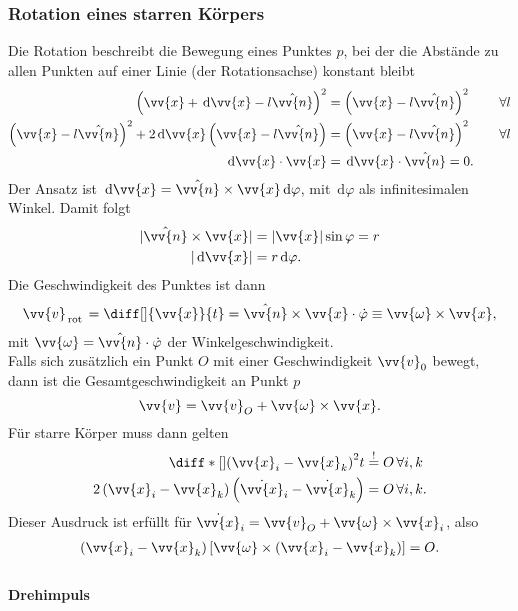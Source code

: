 \documentclass[a4paper,12pt]{article}
\newcommand{\td}{\,\text{d}}
\numberwithin{equation}{section}
\begin{document}
\subsubsection{Rotation eines starren Körpers}
Die Rotation beschreibt die Bewegung eines Punktes $p$, bei der die Abstände zu allen Punkten auf einer Linie (der Rotationsachse) konstant bleibt
\begin{align*}
        \left(\vv{x}+\td \vv{x}-l\hat{\vv{n}}\right)^2&=\left(\vv{x}-l\hat{\vv{n}}\right)^2\qquad \,\forall l\\
        \left(\vv{x}-l\hat{\vv{n}}\right)^2+2\td \vv{x}\left(\vv{x}-l\hat{\vv{n}}\right)&=\left(\vv{x}-l\hat{\vv{n}}\right)^2\qquad \,\forall l\\
        \td \vv{x}\cdot \vv{x}&=\td \vv{x}\cdot \hat{\vv{n}}=0
.\end{align*}
Der Ansatz ist $\td \vv{x}=\hat{\vv{n}}\times \vv{x}\td \varphi $, mit $\td \varphi $ als infinitesimalen Winkel. Damit folgt
\begin{align*}
        |\hat{\vv{n}}\times \vv{x}|&=|\vv{x}|\sin \varphi =r\\
        |\td \vv{x}|&=r\td \varphi 
.\end{align*}
Die Geschwindigkeit des Punktes ist dann
\begin{align*}
        \vv{v}_{\,\text{rot}\,}=\diff[]{\vv{x}}{t}=\hat{\vv{n}}\times \vv{x}\cdot \dot{\varphi }\equiv \vv{\omega }\times \vv{x}
,\end{align*}
mit $\vv{\omega }=\hat{\vv{n}}\cdot \dot{\varphi }$ der Winkelgeschwindigkeit.\\\indent
Falls sich zusätzlich ein Punkt $O$ mit einer Geschwindigkeit $\vv{v}_0$ bewegt, dann ist die Gesamtgeschwindigkeit an Punkt $p$
\[ 
        \vv{v}=\vv{v}_O+\vv{\omega }\times \vv{x}
.\] 
Für starre Körper muss dann gelten
\begin{align*}
        \diff*[]{\left(\vv{x}_i-\vv{x}_k\right)^2}{t}&\stackrel{!}{=}O\,\forall i,k\\
        2\left(\vv{x}_i-\vv{x}_k\right)\left(\dot{\vv{x}}_i-\dot{\vv{x}}_k\right)&=O\,\forall i,k
.\end{align*}
Dieser Ausdruck ist erfüllt für $\dot{\vv{x}}_i=\vv{v}_O+\vv{\omega }\times \vv{x}_i$, also
\begin{align*}
        \left(\vv{x}_i-\vv{x}_k\right)\left[\vv{\omega }\times \left(\vv{x}_i-\vv{x}_k\right)\right]=O
.\end{align*}
\hfill\\\textbf{Drehimpuls}\\ 
\end{document}
